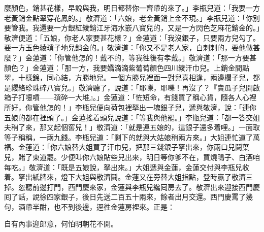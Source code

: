 麼顏色，銷甚花樣，早說與我，明日都替你一齊帶的來了。」李瓶兒道：「我要一方老黃銷金點翠穿花鳳的。」敬濟道：「六娘，老金黃銷上金不現。」李瓶兒道：「你別要管我。我還要一方銀紅綾銷江牙海水嵌八寶兒的，又是一方閃色芝麻花銷金的。」敬濟便道：「五娘，你老人家要甚花樣？」金蓮道：「我沒銀子，只要兩方兒勾了。要一方玉色綾瑣子地兒銷金的。」敬濟道：「你又不是老人家，白剌剌的，要他做甚麼？」金蓮道：「你管他怎的！戴不的，等我徃後有孝戴。」{}敬濟道：「那一方要甚顏色？」金蓮道：「那一方，我要嬌滴滴紫葡萄顏色四川綾汗巾兒。上銷金間點翠，十樣錦，同心結，方勝地兒。一個方勝兒裡面一對兒喜相逢，兩邊欄子兒，都是纓絡珍珠碎八寶兒。」敬濟聽了，說道：「耶嚛，耶嚛！再沒了？『賣瓜子兒開啟箱子打嚏噴——瑣碎一大堆』。」金蓮道：「恠短命，有錢買了稱心貨，隨各人心裡所好，你管他怎的！」李瓶兒便向荷包裡拏出一塊銀子兒，遞與敬濟，說：「連你五娘的都在裡頭了。」金蓮搖着頭兒說道：「等我與他罷。」{}李瓶兒道：「都一答交姐夫稍了來，那又起個窖兒！」敬濟道：「就是連五娘的，這銀子還多着哩。」一面取等子稱稱，一兩九錢。李瓶兒道：「剩下的就與大姑娘稍兩方來。」大姐連忙道了萬福。金蓮道：「你六娘替大姐買了汗巾兒，把那三錢銀子拏出來，你兩口兒鬪葉兒，賭了東道罷。{}少便叫你六娘貼些兒出來，{}明日等你爹不在，買燒鴨子、白酒咱每吃。」敬濟道：「既是五娘說，拏出來。」大姐遞與金蓮，金蓮交付與李瓶兒收着。拏出紙牌來，燈下大姐與敬濟鬪。金蓮又在旁替大姐指點，登時贏了敬濟三掉。忽聽前邊打門，西門慶來家，金蓮與李瓶兒纔囘房去了。敬濟出來迎接西門慶囘了話，說徐四家銀子，後日先送二百五十兩來，餘者出月交還。西門慶罵了幾句，酒帶半酣，也不到後邊，逕徃金蓮房裡來。正是：

\begin{myquote}
自有內事迎郎意，何怕明朝花不開。
\end{myquote}

